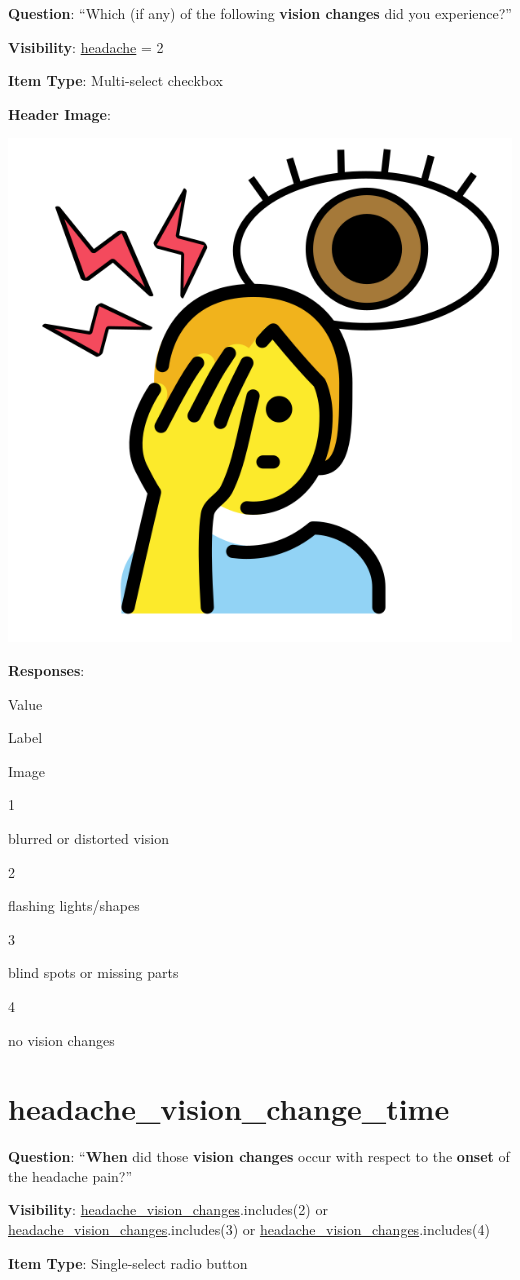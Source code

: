 \documentclass[]{book}
\begin{document}
\textbf{Question}: ``Which (if any) of the following \textbf{vision changes} did you experience?''

\textbf{Visibility}: \protect\hyperlink{headache}{headache} = 2

\textbf{Item Type}: Multi-select checkbox

\textbf{Header Image}:

\begin{flushleft}\includegraphics[width=0.33\linewidth]{downloadFigs4latex_NIMH_Applet_Codebook/headache_vision_changes_headerImg} \end{flushleft}

\textbf{Responses}:

Value

Label

Image

1

blurred or distorted vision

2

flashing lights/shapes

3

blind spots or missing parts

4

no vision changes

\hypertarget{headache_vision_change_time}{%
\section{headache\_vision\_change\_time}\label{headache_vision_change_time}}

\textbf{Question}: ``\textbf{When} did those \textbf{vision changes} occur with respect to the \textbf{onset} of the headache pain?''

\textbf{Visibility}: \protect\hyperlink{headache_vision_changes}{headache\_vision\_changes}.includes(2) or \protect\hyperlink{headache_vision_changes}{headache\_vision\_changes}.includes(3) or \protect\hyperlink{headache_vision_changes}{headache\_vision\_changes}.includes(4)

\textbf{Item Type}: Single-select radio button
\end{document}

